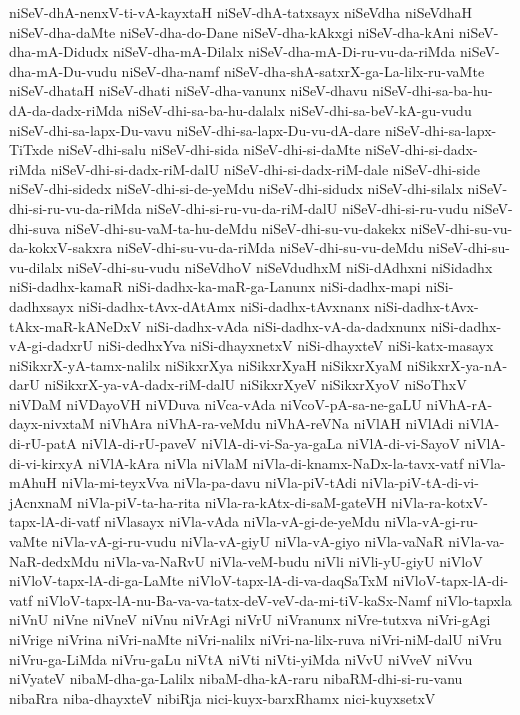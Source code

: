 {niSeV-dhA-nenxV-ti-vA-kayxtaH
niSeV-dhA-tatxsayx
niSeVdha
niSeVdhaH
niSeV-dha-daMte
niSeV-dha-do-Dane
niSeV-dha-kAkxgi
niSeV-dha-kAni
niSeV-dha-mA-Didudx
niSeV-dha-mA-Dilalx
niSeV-dha-mA-Di-ru-vu-da-riMda
niSeV-dha-mA-Du-vudu
niSeV-dha-namf
niSeV-dha-shA-satxrX-ga-La-lilx-ru-vaMte
niSeV-dhataH
niSeV-dhati
niSeV-dha-vanunx
niSeV-dhavu
niSeV-dhi-sa-ba-hu-dA-da-dadx-riMda
niSeV-dhi-sa-ba-hu-dalalx
niSeV-dhi-sa-beV-kA-gu-vudu
niSeV-dhi-sa-lapx-Du-vavu
niSeV-dhi-sa-lapx-Du-vu-dA-dare
niSeV-dhi-sa-lapx-TiTxde
niSeV-dhi-salu
niSeV-dhi-sida
niSeV-dhi-si-daMte
niSeV-dhi-si-dadx-riMda
niSeV-dhi-si-dadx-riM-dalU
niSeV-dhi-si-dadx-riM-dale
niSeV-dhi-side
niSeV-dhi-sidedx
niSeV-dhi-si-de-yeMdu
niSeV-dhi-sidudx
niSeV-dhi-silalx
niSeV-dhi-si-ru-vu-da-riMda
niSeV-dhi-si-ru-vu-da-riM-dalU
niSeV-dhi-si-ru-vudu
niSeV-dhi-suva
niSeV-dhi-su-vaM-ta-hu-deMdu
niSeV-dhi-su-vu-dakekx
niSeV-dhi-su-vu-da-kokxV-sakxra
niSeV-dhi-su-vu-da-riMda
niSeV-dhi-su-vu-deMdu
niSeV-dhi-su-vu-dilalx
niSeV-dhi-su-vudu
niSeVdhoV
niSeVdudhxM
niSi-dAdhxni
niSidadhx
niSi-dadhx-kamaR
niSi-dadhx-ka-maR-ga-Lanunx
niSi-dadhx-mapi
niSi-dadhxsayx
niSi-dadhx-tAvx-dAtAmx
niSi-dadhx-tAvxnanx
niSi-dadhx-tAvx-tAkx-maR-kANeDxV
niSi-dadhx-vAda
niSi-dadhx-vA-da-dadxnunx
niSi-dadhx-vA-gi-dadxrU
niSi-dedhxYva
niSi-dhayxnetxV
niSi-dhayxteV
niSi-katx-masayx
niSikxrX-yA-tamx-nalilx
niSikxrXya
niSikxrXyaH
niSikxrXyaM
niSikxrX-ya-nA-darU
niSikxrX-ya-vA-dadx-riM-dalU
niSikxrXyeV
niSikxrXyoV
niSoThxV
niVDaM
niVDayoVH
niVDuva
niVca-vAda
niVcoV-pA-sa-ne-gaLU
niVhA-rA-dayx-nivxtaM
niVhAra
niVhA-ra-veMdu
niVhA-reVNa
niVlAH
niVlAdi
niVlA-di-rU-patA
niVlA-di-rU-paveV
niVlA-di-vi-Sa-ya-gaLa
niVlA-di-vi-SayoV
niVlA-di-vi-kirxyA
niVlA-kAra
niVla
niVlaM
niVla-di-knamx-NaDx-la-tavx-vatf
niVla-mAhuH
niVla-mi-teyxVva
niVla-pa-davu
niVla-piV-tAdi
niVla-piV-tA-di-vi-jAcnxnaM
niVla-piV-ta-ha-rita
niVla-ra-kAtx-di-saM-gateVH
niVla-ra-kotxV-tapx-lA-di-vatf
niVlasayx
niVla-vAda
niVla-vA-gi-de-yeMdu
niVla-vA-gi-ru-vaMte
niVla-vA-gi-ru-vudu
niVla-vA-giyU
niVla-vA-giyo
niVla-vaNaR
niVla-va-NaR-dedxMdu
niVla-va-NaRvU
niVla-veM-budu
niVli
niVli-yU-giyU
niVloV
niVloV-tapx-lA-di-ga-LaMte
niVloV-tapx-lA-di-va-daqSaTxM
niVloV-tapx-lA-di-vatf
niVloV-tapx-lA-nu-Ba-va-va-tatx-deV-veV-da-mi-tiV-kaSx-Namf
niVlo-tapxla
niVnU
niVne
niVneV
niVnu
niVrAgi
niVrU
niVranunx
niVre-tutxva
niVri-gAgi
niVrige
niVrina
niVri-naMte
niVri-nalilx
niVri-na-lilx-ruva
niVri-niM-dalU
niVru
niVru-ga-LiMda
niVru-gaLu
niVtA
niVti
niVti-yiMda
niVvU
niVveV
niVvu
niVyateV
nibaM-dha-ga-Lalilx
nibaM-dha-kA-raru
nibaRM-dhi-si-ru-vanu
nibaRra
niba-dhayxteV
nibiRja
nici-kuyx-barxRhamx
nici-kuyxsetxV
}
